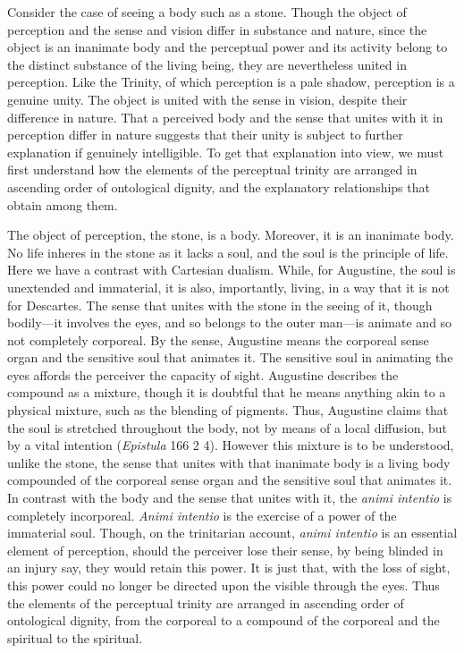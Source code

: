 \documentclass[12pt]{article}
\begin{document}
Consider the case of seeing a body such as a stone. Though the object of perception and the sense and vision differ in substance and nature, since the object is an inanimate body and the perceptual power and its activity belong to the distinct substance of the living being, they are nevertheless united in perception. Like the Trinity, of which perception is a pale shadow, perception is a genuine unity. The object is united with the sense in vision, despite their difference in nature. That a perceived body and the sense that unites with it in perception differ in nature suggests that their unity is subject to further explanation if genuinely intelligible. To get that explanation into view, we must first understand how the elements of the perceptual trinity are arranged in ascending order of ontological dignity, and the explanatory relationships that obtain among them.

The object of perception, the stone, is a body. Moreover, it is an inanimate body. No life inheres in the stone as it lacks a soul, and the soul is the principle of life. Here we have a contrast with Cartesian dualism. While, for Augustine, the soul is unextended and immaterial, it is also, importantly, living, in a way that it is not for Descartes. The sense that unites with the stone in the seeing of it, though bodily---it involves the eyes, and so belongs to the outer man---is animate and so not completely corporeal. By the sense, Augustine means the corporeal sense organ and the sensitive soul that animates it. The sensitive soul in animating the eyes affords the perceiver the capacity of sight. Augustine describes the compound as a mixture, though it is doubtful that he means anything akin to a physical mixture, such as the blending of pigments. Thus, Augustine claims that the soul is stretched throughout the body, not by means of a local diffusion, but by a vital intention (\emph{Epistula} 166 2 4). However this mixture is to be understood, unlike the stone, the sense that unites with that inanimate body is a living body compounded of the corporeal sense organ and the sensitive soul that animates it. In contrast with the body and the sense that unites with it, the \emph{animi intentio} is completely incorporeal. \emph{Animi intentio} is the exercise of a power of the immaterial soul. Though, on the trinitarian account, \emph{animi intentio} is an essential element of perception, should the perceiver lose their sense, by being blinded in an injury say, they would retain this power. It is just that, with the loss of sight, this power could no longer be directed upon the visible through the eyes. Thus the elements of the perceptual trinity are arranged in ascending order of ontological dignity, from the corporeal to a compound of the corporeal and the spiritual to the spiritual.
\end{document}
